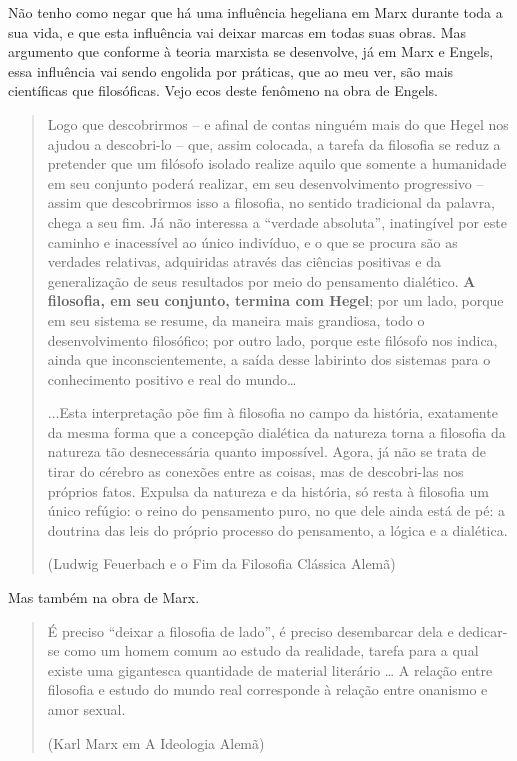Não tenho como negar que há uma influência hegeliana em Marx durante toda a sua vida, e que esta influência vai deixar marcas em todas suas obras. Mas argumento que conforme à teoria marxista se desenvolve, já em Marx e Engels, essa influência vai sendo engolida por práticas, que ao meu ver, são mais científicas que filosóficas. Vejo ecos deste fenômeno na obra de Engels.

\begin{quote}
Logo que descobrirmos – e afinal de contas ninguém mais do que Hegel nos ajudou a descobri-lo – que, assim colocada, a tarefa da filosofia se reduz a pretender que um filósofo isolado realize aquilo que somente a humanidade em seu conjunto poderá realizar, em seu desenvolvimento progressivo – assim que descobrirmos isso a filosofia, no sentido tradicional da palavra, chega a seu fim. Já não interessa a “verdade absoluta”, inatingível por este caminho e inacessível ao único indivíduo, e o que se procura são as verdades relativas, adquiridas através das ciências positivas e da generalização de seus resultados por meio do pensamento dialético.\textbf{ A filosofia, em seu conjunto, termina com Hegel}; por um lado, porque em seu sistema se resume, da maneira mais grandiosa, todo o desenvolvimento filosófico; por outro lado, porque este filósofo nos indica, ainda que inconscientemente, a saída desse labirinto dos sistemas para o conhecimento positivo e real do mundo…

...Esta interpretação põe fim à filosofia no campo da história, exatamente da mesma forma que a concepção dialética da natureza torna a filosofia da natureza tão desnecessária quanto impossível. Agora, já não se trata de tirar do cérebro as conexões entre as coisas, mas de descobri-las nos próprios fatos. Expulsa da natureza e da história, só resta à filosofia um único refúgio: o reino do pensamento puro, no que dele ainda está de pé: a doutrina das leis do próprio processo do pensamento, a lógica e a dialética.

(Ludwig Feuerbach e o Fim da Filosofia Clássica Alemã)
\end{quote}

Mas também na obra de Marx.

\begin{quote}
É preciso “deixar a filosofia de lado”, é preciso desembarcar dela e dedicar-se como um homem comum ao estudo da realidade, tarefa para a qual existe uma gigantesca quantidade de material literário … A relação entre filosofia e estudo do mundo real corresponde à relação entre onanismo e amor sexual.

(Karl Marx em A Ideologia Alemã)
\end{quote}


